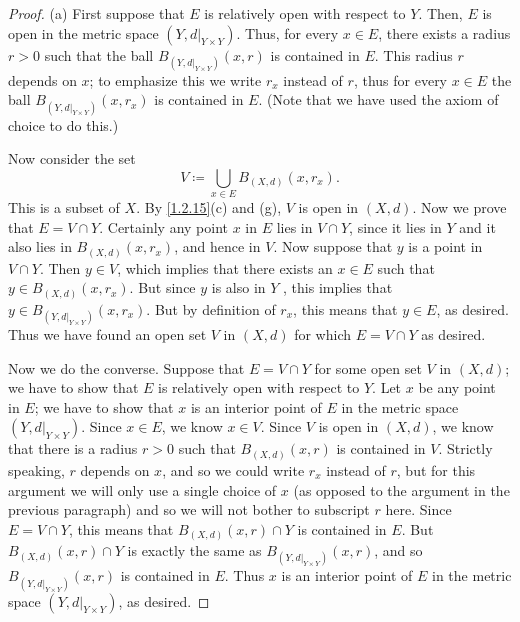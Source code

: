 \begin{proof}{(a)}
  First suppose that \(E\) is relatively open with respect to \(Y\).
  Then, \(E\) is open in the metric space \((Y, d|_{Y \times Y})\).
  Thus, for every \(x \in E\), there exists a radius \(r > 0\) such that the ball \(B_{(Y, d|_{Y \times Y})}(x, r)\) is contained in \(E\).
  This radius \(r\) depends on \(x\);
  to emphasize this we write \(r_x\) instead of \(r\), thus for every \(x \in E\) the ball \(B_{(Y, d|_{Y \times Y})}(x, r_x)\) is contained in \(E\).
  (Note that we have used the axiom of choice to do this.)

  Now consider the set
  \[
    V \coloneqq \bigcup_{x \in E} B_{(X, d)}(x, r_x).
  \]
  This is a subset of \(X\).
  By \cref{1.2.15}(c) and (g), \(V\) is open in \((X, d)\).
  Now we prove that \(E = V \cap Y\).
  Certainly any point \(x\) in \(E\) lies in \(V \cap Y\), since it lies in \(Y\) and it also lies in \(B_{(X, d)}(x, r_x)\), and hence in \(V\).
  Now suppose that \(y\) is a point in \(V \cap Y\).
  Then \(y \in V\), which implies that there exists an \(x \in E\) such that \(y \in B_{(X, d)}(x, r_x)\).
  But since \(y\) is also in \(Y\) , this implies that \(y \in B_{(Y, d|_{Y \times Y})}(x, r_x)\).
  But by definition of \(r_x\), this means that \(y \in E\), as desired.
  Thus we have found an open set \(V\) in \((X, d)\) for which \(E = V \cap Y\) as desired.

  Now we do the converse.
  Suppose that \(E = V \cap Y\) for some open set \(V\) in \((X, d)\);
  we have to show that \(E\) is relatively open with respect to \(Y\).
  Let \(x\) be any point in \(E\);
  we have to show that \(x\) is an interior point of \(E\) in the metric space \((Y, d|_{Y \times Y})\).
  Since \(x \in E\), we know \(x \in V\).
  Since \(V\) is open in \((X, d)\), we know that there is a radius \(r > 0\) such that \(B_{(X, d)}(x, r)\) is contained in \(V\).
  Strictly speaking, \(r\) depends on \(x\), and so we could write \(r_x\) instead of \(r\), but for this argument we will only use a single choice of \(x\) (as opposed to the argument in the previous paragraph) and so we will not bother to subscript \(r\) here.
  Since \(E = V \cap Y\), this means that \(B_{(X, d)}(x, r) \cap Y\) is contained in \(E\).
  But \(B_{(X, d)}(x, r) \cap Y\) is exactly the same as \(B_{(Y, d|_{Y \times Y})}(x, r)\), and so \(B_{(Y, d|_{Y \times Y})}(x, r)\) is contained in \(E\).
  Thus \(x\) is an interior point of \(E\) in the metric space \((Y, d|_{Y \times Y})\), as desired.
\end{proof}


